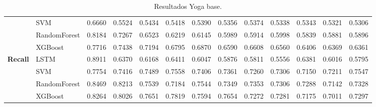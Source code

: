 \begin{table}[h]
\begin{adjustbox}{max width=15cm}
\begin{tabular}{|c|l|r|r|r|r|r|r|r|r|r|r|r|}
			& SVM &  0.6660 &  0.5524 &  0.5434 &  0.5418 &  0.5390 &  0.5356 &  0.5374 &  0.5338 &  0.5343 &  0.5321 &  0.5306 \\
			& RandomForest &  0.8184 &  0.7267 &  0.6523 &  0.6219 &  0.6145 &  0.5989 &  0.5914 &  0.5998 &  0.5839 &  0.5881 &  0.5896 \\
			& XGBoost &  0.7716 &  0.7438 &  0.7194 &  0.6795 &  0.6870 &  0.6590 &  0.6608 &  0.6560 &  0.6406 &  0.6369 &  0.6361 \\
			\hline
			\textbf{Recall} & LSTM &  0.8911 &  0.6370 &  0.6168 &  0.6411 &  0.6047 &  0.5876 &  0.5811 &  0.5556 &  0.6381 &  0.6016 &  0.5795 \\
			& SVM &  0.7754 &  0.7416 &  0.7489 &  0.7558 &  0.7406 &  0.7361 &  0.7260 &  0.7306 &  0.7150 &  0.7211 &  0.7547 \\
			& RandomForest &  0.8469 &  0.8213 &  0.7539 &  0.7184 &  0.7544 &  0.7349 &  0.7353 &  0.7306 &  0.7288 &  0.7142 &  0.7328 \\
			& XGBoost &  0.8264 &  0.8026 &  0.7651 &  0.7819 &  0.7594 &  0.7654 &  0.7272 &  0.7281 &  0.7175 &  0.7011 &  0.7297 \\
			\hline
		\end{tabular}
	\end{adjustbox}
	\caption{Resultados Yoga base.}
	\label{tab:Yoga_base}
\end{table}
\newpage

